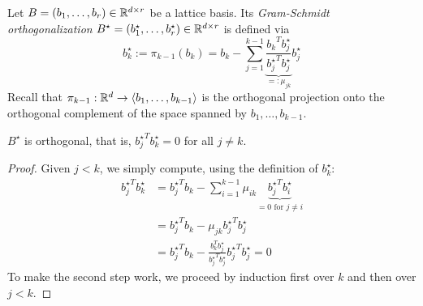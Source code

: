 \begin{definition}
  Let $B = (b_1, \ldots, b_r) \in \mathbb{R}^{d \times r}$ be a lattice basis.
  Its \emph{Gram-Schmidt orthogonalization} $B^\star = (b_1^\star, \ldots, b_r^\star) \in \mathbb{R}^{d \times r}$
  is defined via
  \[
    b_k^\star := \pi_{k-1}(b_k)
      = b_k - \sum_{j=1}^{k-1} \underbrace{\frac{{b_k}^T b_j^\star}{{b_j^\star}^T b_j^\star}}_{=: \mu_{jk}} b_j^\star
  \]
  Recall that $\pi_{k-1} : \mathbb{R}^d \to \langle b_1, \ldots, b_{k-1} \rangle$ is the orthogonal projection
  onto the orthogonal complement of the space spanned by $b_1, \ldots, b_{k-1}$.
\end{definition}
\begin{lemma}
  $B^\star$ is orthogonal, that is, ${b_j^\star}^T b_k^\star = 0$ for all $j \neq k$.
\end{lemma}
\begin{proof}
  Given $j < k$, we simply compute, using the definition of $b_k^\star$:
  \begin{align*}
    {b_j^\star}^T b_k^\star
      &= {b_j^\star}^T b_k - \sum_{i=1}^{k-1} \mu_{ik} \underbrace{{b_j^\star}^T b_i^\star}_{= 0 \text{ for } j \neq i} \\
      &= {b_j^\star}^T b_k - \mu_{jk} {b_j^\star}^T b_j^\star \\
      &= {b_j^\star}^T b_k - \frac{b_k^T b_j^\star}{{b_j^\star}^T b_j^\star} {b_j^\star}^T b_j^\star = 0
  \end{align*}
  To make the second step work, we proceed by induction first over $k$ and then over $j < k$.
\end{proof}

